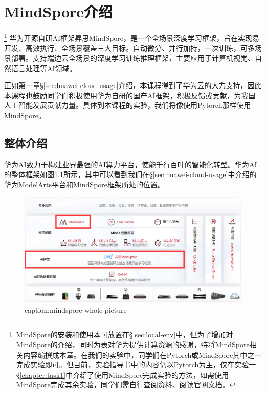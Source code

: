 \chapter{MindSpore介绍}

\footnote{MindSpore的安装和使用本可放置在\S\ref{sec:local-env}中，但为了增加对MindSpore的介绍，同时为表对华为提供计算资源的感谢，特将MindSpore相关内容编撰成本章。在我们的实验中，同学们在Pytorch或MindSpore其中之一完成实验即可。但目前，实验指导书中的内容仍以Pytorch为主，仅在实验一\S\ref{chapter:task1}中介绍了使用MindSpore完成实验的方法，如需使用MindSpore完成其余实验，同学们需自行查阅资料、阅读官网文档。}
华为开源自研AI框架{昇}思MindSpore，是一个全场景深度学习框架，旨在实现易开发、高效执行、全场景覆盖三大目标。自动微分、并行加持，一次训练，可多场景部署。支持端边云全场景的深度学习训练推理框架，主要应用于计算机视觉、自然语言处理等AI领域。

正如第一章\S\ref{sec:huawei-cloud-usage}介绍，本课程得到了华为云的大力支持，因此本课程也鼓励同学们积极使用华为自研的国产AI框架，积极反馈或贡献，为我国人工智能发展贡献力量。具体到本课程的实验，我们将像使用Pytorch那样使用MindSpore。



\section{整体介绍}

华为AI致力于构建业界最强的AI算力平台，使能千行百叶的智能化转型。华为AI的整体框架如图\ref{fig:mindspore-whole-picture}所示，其中可以看到我们在\S\ref{sec:huawei-cloud-usage}中介绍的华为ModelArts平台和MindSpore框架所处的位置。
\begin{figure}[htbp]
	\centering
	\includegraphics[width=1\textwidth]{figures/mindspore-whole-picture.png}
	\caption{caption:mindspore-whole-picture}
	\label{fig:mindspore-whole-picture}
\end{figure}

